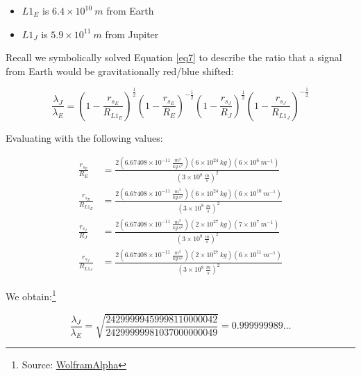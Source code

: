 \documentclass[]{report}
\begin{document}
      \begin{itemize}
        \item $L1_E$ is $6.4\times10^{10}\ m$ from Earth
        \item $L1_J$ is $5.9\times10^{11}\ m$ from Jupiter
        \end{itemize}

      Recall we symbolically solved Equation \ref{eq7} to describe the ratio that a signal from Earth would be gravitationally red/blue shifted:

      \begin{equation*}
        \frac{\lambda_J}{\lambda_E} = \left(1 - \frac{r_{s_E}}{R_{L1_E}} \right)^{\frac{1}{2}} \left(1 - \frac{r_{s_E}}{R_E} \right)^{-\frac{1}{2}}\left(1 - \frac{r_{s_J}}{R_{J}} \right)^{\frac{1}{2}} \left(1 - \frac{r_{s_J}}{R_{L1_J}} \right)^{-\frac{1}{2}}
        \end{equation*}

      Evaluating with the following values:

      \begin{align*} \label{given_numeric}
        \frac{r_{s_E}}{R_{E}} &= \frac{2( 6.67408\times10^{-11}\ \frac{m^3}{kg\ s^{2}})(6\times10^{24}\ kg)(6\times10^{6}\ m^{-1})}{(3\times10^{8}\ \frac{m}{s})^2}\\
        \frac{r_{s_E}}{R_{L1_E}} &= \frac{2( 6.67408\times10^{-11}\ \frac{m^3}{kg\ s^{2}})(6\times10^{24}\ kg)(6\times10^{10}\ m^{-1})}{(3\times10^{8}\ \frac{m}{s})^2}\\
        \frac{r_{s_J}}{R_{J}} &= \frac{2( 6.67408\times10^{-11}\ \frac{m^3}{kg\ s^{2}})(2\times10^{27}\ kg)(7\times10^{7}\ m^{-1})}{(3\times10^{8}\ \frac{m}{s})^2}\\
        \frac{r_{s_J}}{R_{L1_J}} &= \frac{2( 6.67408\times10^{-11}\ \frac{m^3}{kg\ s^{2}})(2\times10^{27}\ kg)(6\times10^{11}\ m^{-1})}{(3\times10^{8}\ \frac{m}{s})^2}
        \end{align*}

      We obtain:\footnote{Source: \href{https://www.wolframalpha.com/input/?i=x\%3D\%28sqrt\%281-a\%2Fb\%29\%2Fsqrt\%281-a\%2Fc\%29\%29\%28sqrt\%281-d\%2Ff\%29\%2Fsqrt\%281-d\%2Fg\%29\%29\%3B+a\%3D\%287*10\%5E-11\%29\%286*10\%5E24\%29\%2F\%289*10\%5E16\%29\%3B+b\%3D6*10\%5E10+\%3B+c+\%3D6*10\%5E6\%3B+d\%3D\%287*10\%5E-11\%29\%282*10\%5E27\%29\%2F\%289*10\%5E16\%29\%3B+f\%3D7*10\%5E7\%3B+g\%3D6*10\%5E11}{WolframAlpha}}

      \begin{equation*}
        \frac{\lambda_J}{\lambda_E} = \sqrt{\frac{24299999459998110000042}{24299999981037000000049}} = 0.999999989\ldots
        \end{equation*}
\end{document}
